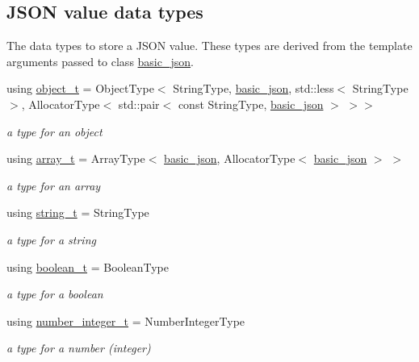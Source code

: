 \subsection*{J\+S\+ON value data types}
\label{_amgrpbddfba6d49869d59bfd397e65b8cba87}%
The data types to store a J\+S\+ON value. These types are derived from the template arguments passed to class \mbox{\hyperlink{classnlohmann_1_1basic__json}{basic\+\_\+json}}. \begin{DoxyCompactItemize}
\item 
using \mbox{\hyperlink{classnlohmann_1_1basic__json_aa1eb13d5aa86f80cbee6c58e90fbaf49}{object\+\_\+t}} = Object\+Type$<$ String\+Type, \mbox{\hyperlink{classnlohmann_1_1basic__json}{basic\+\_\+json}}, std\+::less$<$ String\+Type $>$, Allocator\+Type$<$ std\+::pair$<$ const String\+Type, \mbox{\hyperlink{classnlohmann_1_1basic__json}{basic\+\_\+json}} $>$ $>$$>$
\begin{DoxyCompactList}\small\item\em a type for an object \end{DoxyCompactList}\item 
using \mbox{\hyperlink{classnlohmann_1_1basic__json_ae095578e03df97c5b3991787f1056374}{array\+\_\+t}} = Array\+Type$<$ \mbox{\hyperlink{classnlohmann_1_1basic__json}{basic\+\_\+json}}, Allocator\+Type$<$ \mbox{\hyperlink{classnlohmann_1_1basic__json}{basic\+\_\+json}} $>$ $>$
\begin{DoxyCompactList}\small\item\em a type for an array \end{DoxyCompactList}\item 
using \mbox{\hyperlink{classnlohmann_1_1basic__json_a61f8566a1a85a424c7266fb531dca005}{string\+\_\+t}} = String\+Type
\begin{DoxyCompactList}\small\item\em a type for a string \end{DoxyCompactList}\item 
using \mbox{\hyperlink{classnlohmann_1_1basic__json_a4c919102a9b4fe0d588af64801436082}{boolean\+\_\+t}} = Boolean\+Type
\begin{DoxyCompactList}\small\item\em a type for a boolean \end{DoxyCompactList}\item 
using \mbox{\hyperlink{classnlohmann_1_1basic__json_a98e611d67b7bd75307de99c9358ab2dc}{number\+\_\+integer\+\_\+t}} = Number\+Integer\+Type
\begin{DoxyCompactList}\small\item\em a type for a number (integer) \end{DoxyCompactList}\item 
$$
\end{DoxyCompactItemize}
